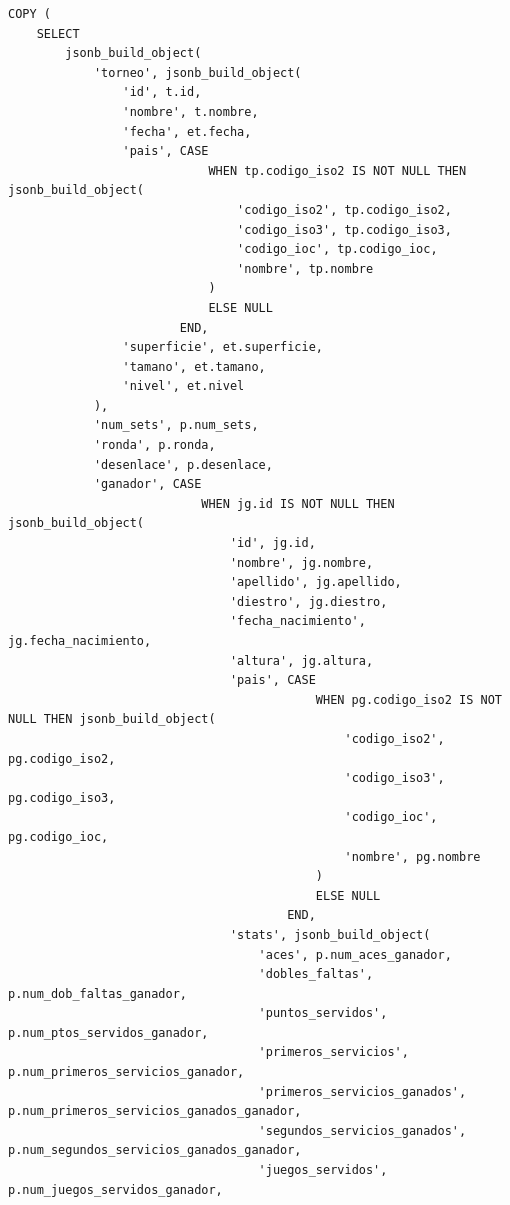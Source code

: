 \begin{verbatim}
COPY (
    SELECT 
        jsonb_build_object(
            'torneo', jsonb_build_object(
                'id', t.id,
                'nombre', t.nombre,
                'fecha', et.fecha,
                'pais', CASE 
                            WHEN tp.codigo_iso2 IS NOT NULL THEN jsonb_build_object(
                                'codigo_iso2', tp.codigo_iso2,
                                'codigo_iso3', tp.codigo_iso3,
                                'codigo_ioc', tp.codigo_ioc,
                                'nombre', tp.nombre
                            )
                            ELSE NULL 
                        END,
                'superficie', et.superficie,
                'tamano', et.tamano,
                'nivel', et.nivel
            ),
            'num_sets', p.num_sets,
            'ronda', p.ronda,
            'desenlace', p.desenlace,
            'ganador', CASE 
                           WHEN jg.id IS NOT NULL THEN jsonb_build_object(
                               'id', jg.id,
                               'nombre', jg.nombre,
                               'apellido', jg.apellido,
                               'diestro', jg.diestro,
                               'fecha_nacimiento', jg.fecha_nacimiento,
                               'altura', jg.altura,
                               'pais', CASE 
                                           WHEN pg.codigo_iso2 IS NOT NULL THEN jsonb_build_object(
                                               'codigo_iso2', pg.codigo_iso2,
                                               'codigo_iso3', pg.codigo_iso3,
                                               'codigo_ioc', pg.codigo_ioc,
                                               'nombre', pg.nombre
                                           )
                                           ELSE NULL 
                                       END,
                               'stats', jsonb_build_object(
                                   'aces', p.num_aces_ganador,
                                   'dobles_faltas', p.num_dob_faltas_ganador,
                                   'puntos_servidos', p.num_ptos_servidos_ganador,
                                   'primeros_servicios', p.num_primeros_servicios_ganador,
                                   'primeros_servicios_ganados', p.num_primeros_servicios_ganados_ganador,
                                   'segundos_servicios_ganados', p.num_segundos_servicios_ganados_ganador,
                                   'juegos_servidos', p.num_juegos_servidos_ganador,

\end{verbatim}
